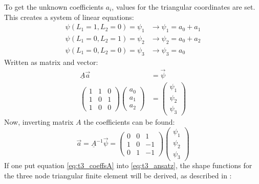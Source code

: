   To get the unknown coefficients $a_i$, values for the triangular coordinates are set. This creates a system of linear equations:
  \begin{align}
  \psi(L_1=1, L_2=0) = \psi_1 &\rightarrow \psi_1 = a_0 + a_1 \nonumber\\
  \psi(L_1=0, L_2=1) = \psi_2 &\rightarrow \psi_2 = a_0 + a_2 \nonumber\\
  \psi(L_1=0, L_2=0) = \psi_3 &\rightarrow \psi_3 = a_0
  \end{align}
  Written as matrix and vector:
  \begin{align}
  \underline{A} \vec{a} &= \vec{\psi} \nonumber\\
  \begin{pmatrix}
  1 & 1 & 0\\
  1 & 0 & 1\\
  1 & 0 & 0
  \end{pmatrix} \begin{pmatrix}
  a_0 \\ a_1 \\ a_2
  \end{pmatrix} &= \begin{pmatrix}
  \psi_1 \\ \psi_2 \\ \psi_3
  \end{pmatrix}
  \end{align}
  Now, inverting matrix $A$ the coefficients can be found:
  \begin{equation}\label{eq:t3_coeffsA}
  \vec{a} = \underline{A}^{-1} \vec{\psi} = \begin{pmatrix}
  0 & 0 & 1\\
  1 & 0 & -1\\
  0 & 1 & -1
  \end{pmatrix} \begin{pmatrix}
  \psi_1 \\ \psi_2 \\ \psi_3
  \end{pmatrix}
  \end{equation}
  If one put equation \eqref{eq:t3_coeffsA} into \eqref{eq:t3_ansatz}, the shape functions for the three node triangular finite element will be derived, as described in \cite{steinke2005finite}:
